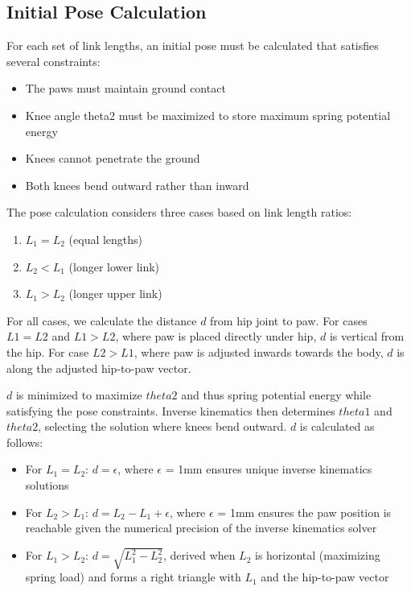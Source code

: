 \subsection{Initial Pose Calculation}
For each set of link lengths, an initial pose must be calculated that satisfies several constraints:
\begin{itemize}
    \item The paws must maintain ground contact
    \item Knee angle theta2 must be maximized to store maximum spring potential energy
    \item Knees cannot penetrate the ground
    \item Both knees bend outward rather than inward
\end{itemize}

The pose calculation considers three cases based on link length ratios:

\begin{enumerate}
    \item \(L_1 = L_2\) (equal lengths)
    \item \(L_2 < L_1\) (longer lower link)
    \item \(L_1 > L_2\) (longer upper link)
\end{enumerate}

For all cases, we calculate the distance \(d\) from hip joint to paw. For cases $L1=L2$ and $L1>L2$, where paw is placed directly under hip, \(d\) is vertical from the hip. For case $L2>L1$, where paw is adjusted inwards towards the body, \(d\) is along the adjusted hip-to-paw vector. 

 \(d\) is minimized to maximize \(theta2\) and thus spring potential energy while satisfying the pose constraints. Inverse kinematics then determines \(theta1\) and \(theta2\), selecting the solution where knees bend outward. \(d\) is calculated as follows:

\begin{itemize}
    \item For \(L_1 = L_2\): \(d = \epsilon\), where \(\epsilon\) = 1mm ensures unique inverse kinematics solutions
    \item For \(L_2 > L_1\): \(d = L_2 - L_1 + \epsilon\), where \(\epsilon\) = 1mm ensures the paw position is reachable given the numerical precision of the inverse kinematics solver
    \item For \(L_1 > L_2\): \(d = \sqrt{L_1^2 - L_2^2}\), derived when \(L_2\) is horizontal (maximizing spring load) and forms a right triangle with \(L_1\) and the hip-to-paw vector
\end{itemize}


